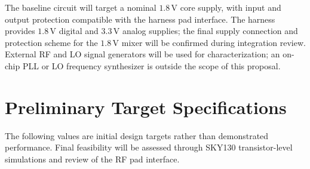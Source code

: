 \documentclass[11pt,letterpaper]{article}
\begin{document}
The baseline circuit will target a nominal \(1.8\,\mathrm{V}\) core supply, with input and output protection compatible with the harness pad interface.
The harness provides \(1.8\,\mathrm{V}\) digital and \(3.3\,\mathrm{V}\) analog supplies; the final supply connection and protection scheme for the \(1.8\,\mathrm{V}\) mixer will be confirmed during integration review.
External RF and LO signal generators will be used for characterization; an on-chip PLL or LO frequency synthesizer is outside the scope of this proposal.


\section{Preliminary Target Specifications}

The following values are initial design targets rather than demonstrated performance.
Final feasibility will be assessed through SKY130 transistor-level simulations and review of the RF pad interface.
\end{document}
